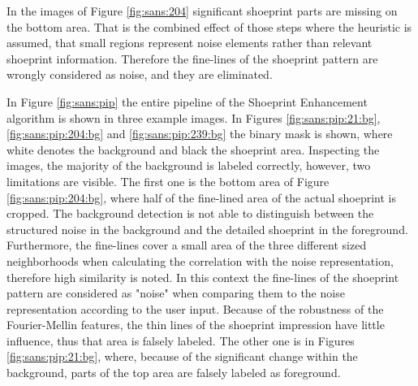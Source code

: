 \documentclass[draft,final]{vutinfth} %
\begin{document}
\par
In the images of Figure \ref{fig:sans:204} significant shoeprint parts are missing on the bottom area.
That is the combined effect of those steps where the heuristic is assumed, that small regions represent noise elements rather than relevant shoeprint information.
Therefore the fine-lines of the shoeprint pattern are wrongly considered as noise, and they are eliminated.
\par
In Figure \ref{fig:sans:pip} the entire pipeline of the Shoeprint Enhancement algorithm is shown in three example images.
In Figures  \ref{fig:sans:pip:21:bg}, \ref{fig:sans:pip:204:bg} and \ref{fig:sans:pip:239:bg} the binary mask is shown, where white denotes the background and black the shoeprint area.
Inspecting the images, the majority of the background is labeled correctly, however, two limitations are visible.
The first one is the bottom area of Figure \ref{fig:sans:pip:204:bg}, where half of the fine-lined area of the actual shoeprint is cropped.
The background detection is not able to distinguish between the structured noise in the background and the detailed shoeprint in the foreground.
Furthermore, the fine-lines cover a small area of the three different sized neighborhoods when calculating the correlation with the noise representation, therefore high similarity is noted.
In this context the fine-lines of the shoeprint pattern are considered as "noise" when comparing them to the noise representation according to the user input.
Because of the robustness of the Fourier-Mellin features, the thin lines of the shoeprint impression have little influence, thus that area is falsely labeled.
The other one is in Figures \ref{fig:sans:pip:21:bg}, where, because of the significant change within the background, parts of the top area are falsely labeled as foreground.
\end{document}
